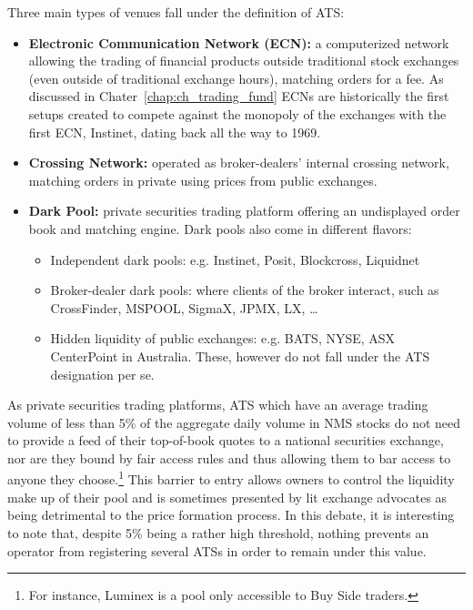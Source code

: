 Three main types of venues fall under the definition of ATS:

\begin{itemize}
\item{\textbf{Electronic Communication Network (ECN):}} a computerized network allowing the trading of financial products outside traditional stock exchanges (even outside of traditional exchange hours), matching orders for a fee. As discussed in Chater~\ref{chap:ch_trading_fund} ECNs are historically the first setups created to compete against the monopoly of the exchanges with the first ECN, Instinet, dating back all the way to 1969. 

\item{\textbf{Crossing Network:}} operated as broker-dealers' internal crossing network, matching orders in private using prices from public exchanges.

\item{\textbf{Dark Pool:}} \label{in:dark} private securities trading platform offering an undisplayed order book and matching engine. Dark pools also come in different flavors:
        \begin{itemize}
        \item{Independent dark pools:} e.g. Instinet, Posit, Blockcross, Liquidnet 
        \item{Broker-dealer dark pools:} where clients of the broker interact, such as  CrossFinder, MSPOOL, SigmaX, JPMX, LX, \dots
        \item{Hidden liquidity of public exchanges:} e.g. BATS, NYSE, ASX CenterPoint in Australia. These, however do not fall under the ATS designation per se.
        \end{itemize}
\end{itemize}


As private securities trading platforms, ATS which have an average trading volume of less than 5\% of the aggregate daily volume in NMS stocks do not need to provide a feed of their top-of-book quotes to a national securities exchange, nor are they bound by fair access rules and thus allowing them to bar access to anyone they choose.\footnote{For instance, Luminex is a pool only accessible to Buy Side traders.} This barrier to entry allows owners to control the liquidity make up of their pool and is sometimes presented by lit exchange advocates as being detrimental to the price formation process. In this debate, it is interesting to note that, despite 5\% being a rather high threshold, nothing prevents an operator from registering several ATSs in order to remain under this value.


